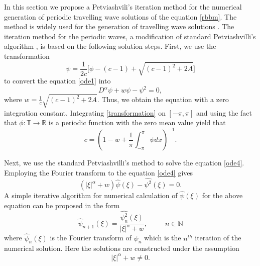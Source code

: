 \documentclass[12pt,reqno]{amsart}
\newcommand{\2}{L^2_{per}(0, T)}
\numberwithin{equation}{section}
\numberwithin{figure}{section}
\begin{document}
In this section we propose a Petviashvili's iteration method for the numerical generation of periodic travelling wave solutions of the equation \eqref{rbbm}.
The method is widely used for the generation of travelling wave solutions \cite{aduran,AD,LP,OBM,PS}.  The iteration method for the periodic waves,   a modification of standard Petviashvilli's algorithm \cite{AD, LP},
is based on the following solution steps.
First, we use the transformation
\begin{equation}\label{transformation}
\psi= \displaystyle\frac{1}{2c} \bigg[ \phi-(c-1)+\sqrt{(c-1)^2+2 A} \bigg]
\end{equation}
to convert the equation \eqref{ode1}  into
\begin{equation}\label{ode4}
{D}^{\alpha} \psi +w \psi -\psi^2 =0,
\end{equation}
where $w= \displaystyle\frac{1}{c} \sqrt{(c-1)^2+2 A}$.
Thus, we   obtain the  equation  with a zero integration constant. \mbox{Integrating} \eqref{transformation} on $[-\pi, \pi]$ and using the fact that $\phi: \mathbb{T}\rightarrow \mathbb{R}$ is a periodic function with the zero mean value yield that
\begin{equation}\label{wavespeed}
c=\left( 1-w+\frac{1}{\pi} \int_{-\pi}^{\pi} \psi dx   \right)^{-1}.
\end{equation}


\noindent Next, we use the standard Petviashvilli's method to solve the equation \eqref{ode4}. Employing the Fourier transform to the equation \eqref{ode4} gives
\begin{equation}%
\left(  |\xi|^{\alpha} + w  \right) \widehat{\psi}(\xi)-  \widehat{\psi^2}(\xi)=0.
\end{equation}
A simple iterative algorithm for numerical calculation of $\widehat{\psi}(\xi)$ for the above equation can be proposed in the form
\begin{equation}\label{iterative1}
\widehat{\psi}_{n+1}(\xi)=\frac{ \widehat{\psi^2_n}(\xi)  }
{|\xi|^{\alpha} + w},\hspace{30pt} n\in\mathbb{N}
\end{equation}
where $\widehat{\psi}_n(\xi)$ is the Fourier transform of ${\psi}_n$ which is the $n^{th}$ iteration of the numerical solution. Here the solutions are constructed under the assumption
\begin{equation}\label{condition}
 |\xi|^{\alpha} + w \neq 0.
 \end{equation}
\end{document}
